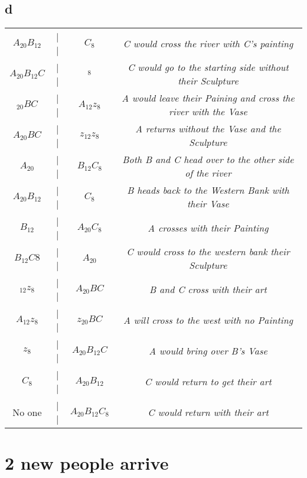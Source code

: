 \documentclass[12pt]{amsart}
\begin{document}
\subsection*{d}
\begin{tabular}{ c c c c }

$A_{20} B_{12}$ & | | & $C_{8}$ & \emph{C would cross the river with C's painting} \\

$A_{20} B_{12} C$ & | | & $_{8}$ & \emph{C would go to the starting side without their Sculpture} \\

$_{20} B C$ & | | & $A_{12} z_{8}$ & \emph{A would leave their Paining and cross the river with the Vase} \\

$A_{20} B C$ & | | & $z_{12} z_{8}$ & \emph{A returns without the Vase and the Sculpture} \\

$A_{20}$ & | | & $B_{12} C_{8}$ & \emph{Both B and C head over to the other side of the river} \\

$A_{20} B_{12}$ & | | & $C_{8}$ & \emph{B heads back to the Western Bank with their Vase} \\

$B_{12}$ & | | & $A_{20} C_{8}$ & \emph{A crosses with their Painting} \\

$B_{12} C{8}$ & | | & $A_{20}$ & \emph{C would cross to the western bank their Sculpture} \\

$_{12} z_{8}$ & | | & $A_{20} B C$ & \emph{B and C cross with their art} \\

$A _{12} z_{8}$ & | | & $z_{20} B C$ & \emph{A will cross to the west with no Painting} \\

$z_{8}$ & | | & $A_{20} B_{12} C$ & \emph{A would bring over B's Vase} \\

$C_{8}$ & | | & $A_{20} B_{12}$ & \emph{C would return to get their art} \\

No one & | | & $A_{20} B_{12} C_{8}$ & \emph{C would return with their art}

\end{tabular}

\section*{2 new people arrive}
\end{document}
